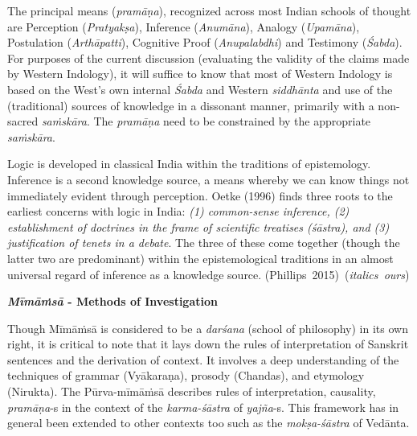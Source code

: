 The principal means ({\sl pramāṇa}), recognized across most Indian schools of thought are Perception ({\sl Pratyakṣa}), Inference ({\sl Anumāna}), Analogy ({\sl Upamāna}), Postulation ({\sl Arthāpatti}), Cognitive Proof ({\sl Anupalabdhi}) and Testimony ({\sl Śabda}). For purposes of the current discussion (evaluating the validity of the claims made by Western Indology), it will suffice to know that most of Western Indology is based on the West's own internal {\sl Śabda} and Western {\sl siddhānta} and use of the (traditional) sources of knowledge in a dissonant manner,  primarily with a non-sacred {\sl saṁ\-skāra}. The {\sl pramāṇa} need to be constrained by the appropriate {\sl saṁskāra}.
\begin{myquote}
Logic is developed in classical India within the traditions of epistemology. Inference is a second knowledge source, a means whereby we can know things not immediately evident through perception. Oetke (1996) finds three roots to the earliest concerns with logic in India: {\sl (1) common-sense inference, (2) establishment of doctrines in the frame of scientific treatises (\sl śāstra\relax), and (3) justification of tenets in a debate}. The three of these come together (though the latter two are predominant) within the epistemological traditions in an almost universal regard of inference as a knowledge source. 
\hfill \hbox{(Phillips 2015) ({\sl italics ours})}
\end{myquote}

\medskip
{\bf {\sl\bfseries Mīmāṁsā} - Methods of Investigation}

Though Mīmāṁsā is considered to be a {\sl darśana} (school of philosophy) in its own right, it is critical to note that it lays down the rules of interpretation of Sanskrit sentences and the derivation of context. It involves a deep understanding of the techniques of grammar (Vyākaraṇa), prosody (Chandas), and etymology (Nirukta). The Pūrva-mīmāṁsā describes rules of interpretation, causality, {\sl pramāṇa}-s in the context of the {\sl karma-śāstra} of {\sl yajña}-s. This framework has in general been extended to other contexts too such as the {\sl mokṣa-śāstra} of Vedānta.

